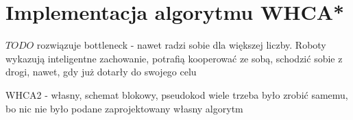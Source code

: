 \section{Implementacja algorytmu WHCA*}
\label{ch:alg-whca}

$TODO$ rozwiązuje bottleneck - nawet radzi sobie dla większej liczby.
Roboty wykazują inteligentne zachowanie, potrafią kooperować ze sobą, schodzić sobie z drogi, nawet, gdy już dotarły do swojego celu

WHCA2 - własny, schemat blokowy, pseudokod
wiele trzeba było zrobić samemu, bo nic nie było podane
zaprojektowany własny algorytm